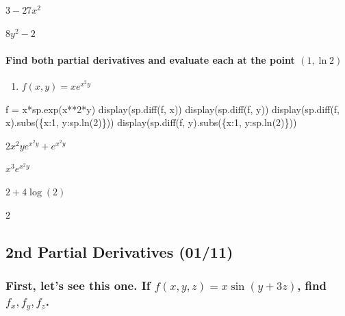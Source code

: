 \documentclass[
  letterpaper,
  DIV=11,
  numbers=noendperiod]{scrartcl}
\let\oldparagraph\paragraph
\renewcommand{\paragraph}[1]{\oldparagraph{#1}\mbox{}}
\newenvironment{Shaded}{\begin{snugshade}}{\end{snugshade}}
\newcommand{\DecValTok}[1]{\textcolor[rgb]{0.68,0.00,0.00}{#1}}
\newcommand{\NormalTok}[1]{\textcolor[rgb]{0.00,0.23,0.31}{#1}}
\newcommand{\OperatorTok}[1]{\textcolor[rgb]{0.37,0.37,0.37}{#1}}
\providecommand{\tightlist}{%
  \setlength{\itemsep}{0pt}\setlength{\parskip}{0pt}}\usepackage{longtable,booktabs,array}
\begin{document}
$\displaystyle 3 - 27 x^{2}$

$\displaystyle 8 y^{2} - 2$

\paragraph{\texorpdfstring{Find both partial derivatives and evaluate
each at the point
\((1, \ln 2)\)}{Find both partial derivatives and evaluate each at the point (1, \textbackslash ln 2)}}\label{find-both-partial-derivatives-and-evaluate-each-at-the-point-1-ln-2}

\begin{enumerate}
\def\labelenumi{\arabic{enumi}.}
\tightlist
\item
  \(f(x, y) = xe^{x^2y}\)
\end{enumerate}

\begin{Shaded}
\begin{Highlighting}[numbers=left,,]
\NormalTok{f }\OperatorTok{=}\NormalTok{ x}\OperatorTok{*}\NormalTok{sp.exp(x}\OperatorTok{**}\DecValTok{2}\OperatorTok{*}\NormalTok{y)}
\NormalTok{display(sp.diff(f, x))}
\NormalTok{display(sp.diff(f, y))}
\NormalTok{display(sp.diff(f, x).subs(\{x:}\DecValTok{1}\NormalTok{, y:sp.ln(}\DecValTok{2}\NormalTok{)\}))}
\NormalTok{display(sp.diff(f, y).subs(\{x:}\DecValTok{1}\NormalTok{, y:sp.ln(}\DecValTok{2}\NormalTok{)\}))}
\end{Highlighting}
\end{Shaded}

$\displaystyle 2 x^{2} y e^{x^{2} y} + e^{x^{2} y}$

$\displaystyle x^{3} e^{x^{2} y}$

$\displaystyle 2 + 4 \log{\left(2 \right)}$

$\displaystyle 2$

\subsection{2nd Partial Derivatives
(01/11)}\label{nd-partial-derivatives-0111}

\subsubsection{\texorpdfstring{First, let's see this one. If
\(f(x, y, z) = x\sin(y+3z)\), find
\(f_x, f_y, f_z\).}{First, let's see this one. If f(x, y, z) = x\textbackslash sin(y+3z), find f\_x, f\_y, f\_z.}}\label{first-lets-see-this-one.-if-fx-y-z-xsiny3z-find-f_x-f_y-f_z.}
\end{document}
